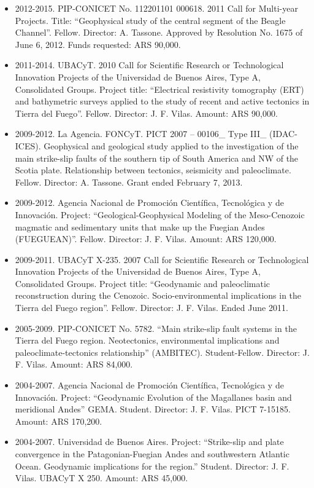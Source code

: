\documentclass[11pt, a4paper]{article}
\begin{document}
\begin{itemize}
  \item 2012-2015. PIP-CONICET No. 112201101 000618. 2011 Call for Multi-year Projects. Title: “Geophysical study of the central segment of the Beagle Channel”. Fellow. Director: A. Tassone. Approved by Resolution No. 1675 of June 6, 2012. Funds requested: ARS 90,000.

  \item 2011-2014. UBACyT. 2010 Call for Scientific Research or Technological Innovation Projects of the Universidad de Buenos Aires, Type A, Consolidated Groups. Project title: “Electrical resistivity tomography (ERT) and bathymetric surveys applied to the study of recent and active tectonics in Tierra del Fuego”. Fellow. Director: J. F. Vilas. Amount: ARS 90,000.

  \item 2009-2012. La Agencia. FONCyT. PICT 2007 – 00106\_ Type III\_ (IDAC-ICES). Geophysical and geological study applied to the investigation of the main strike-slip faults of the southern tip of South America and NW of the Scotia plate. Relationship between tectonics, seismicity and paleoclimate. Fellow. Director: A. Tassone. Grant ended February 7, 2013.

  \item 2009-2012. Agencia Nacional de Promoción Científica, Tecnológica y de Innovación. Project: “Geological-Geophysical Modeling of the Meso-Cenozoic magmatic and sedimentary units that make up the Fuegian Andes (FUEGUEAN)”. Fellow. Director: J. F. Vilas. Amount: ARS 120,000.

  \item 2009-2011. UBACyT X-235. 2007 Call for Scientific Research or Technological Innovation Projects of the Universidad de Buenos Aires, Type A, Consolidated Groups. Project title: “Geodynamic and paleoclimatic reconstruction during the Cenozoic. Socio-environmental implications in the Tierra del Fuego region”. Fellow. Director: J. F. Vilas. Ended June 2011.


  \item 2005-2009. PIP-CONICET No. 5782. “Main strike-slip fault systems in the Tierra del Fuego region. Neotectonics, environmental implications and paleoclimate-tectonics relationship” (AMBITEC). Student-Fellow. Director: J. F. Vilas. Amount: ARS 84,000.

  \item 2004-2007. Agencia Nacional de Promoción Científica, Tecnológica y de Innovación. Project: “Geodynamic Evolution of the Magallanes basin and meridional Andes” GEMA. Student. Director: J. F. Vilas. PICT 7-15185. Amount: ARS 170,200.

  \item 2004-2007. Universidad de Buenos Aires. Project: “Strike-slip and plate convergence in the Patagonian-Fuegian Andes and southwestern Atlantic Ocean. Geodynamic implications for the region.” Student. Director: J. F. Vilas. UBACyT X 250. Amount: ARS 45,000.
\end{itemize}
\end{document}
